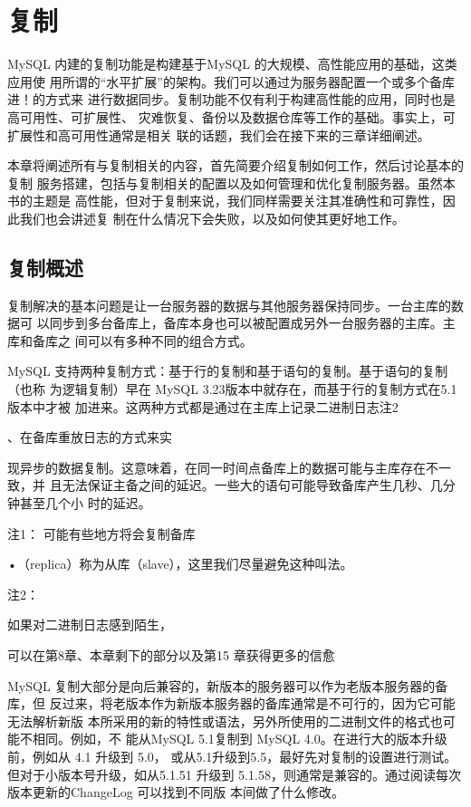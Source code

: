 \chapter{复制}
MySQL 内建的复制功能是构建基于MySQL 的大规模、高性能应用的基础，这类应用使
用所谓的“水平扩展”的架构。我们可以通过为服务器配置一个或多个备库进！的方式来
进行数据同步。复制功能不仅有利于构建高性能的应用，同时也是高可用性、可扩展性、
灾难恢复、备份以及数据仓库等工作的基础。事实上，可扩展性和高可用性通常是相关
联的话题，我们会在接下来的三章详细阐述。

本章将阐述所有与复制相关的内容，首先简要介绍复制如何工作，然后讨论基本的复制
服务搭建，包括与复制相关的配置以及如何管理和优化复制服务器。虽然本书的主题是
高性能，但对于复制来说，我们同样需要关注其准确性和可靠性，因此我们也会讲述复
制在什么情况下会失败，以及如何使其更好地工作。

\section{复制概述}
复制解决的基本问题是让一台服务器的数据与其他服务器保持同步。一台主库的数据可
以同步到多台备库上，备库本身也可以被配置成另外一台服务器的主库。主库和备库之
间可以有多种不同的组合方式。

MySQL 支持两种复制方式：基于行的复制和基于语句的复制。基于语句的复制（也称
为逻辑复制）早在 MySQL 3.23版本中就存在，而基于行的复制方式在5.1版本中才被
加进来。这两种方式都是通过在主库上记录二进制日志注2

、在备库重放日志的方式来实

现异步的数据复制。这意味着，在同一时间点备库上的数据可能与主库存在不一致，并
且无法保证主备之间的延迟。一些大的语句可能导致备库产生几秒、几分钟甚至几个小
时的延迟。

注1： 可能有些地方将会复制备库

•（replica）称为从库（slave），这里我们尽量避免这种叫法。

注2：

如果对二进制日志感到陌生，

可以在第8章、本章剩下的部分以及第15 章获得更多的信愈

MySQL 复制大部分是向后兼容的，新版本的服务器可以作为老版本服务器的备库，但
反过来，将老版本作为新版本服务器的备库通常是不可行的，因为它可能无法解析新版
本所采用的新的特性或语法，另外所使用的二进制文件的格式也可能不相同。例如，不
能从MySQL 5.1复制到 MySQL 4.0。在进行大的版本升级前，例如从 4.1 升级到 5.0，
或从5.1升级到5.5，最好先对复制的设置进行测试。但对于小版本号升级，如从5.1.51
升级到 5.1.58，则通常是兼容的。通过阅读每次版本更新的ChangeLog 可以找到不同版
本间做了什么修改。

